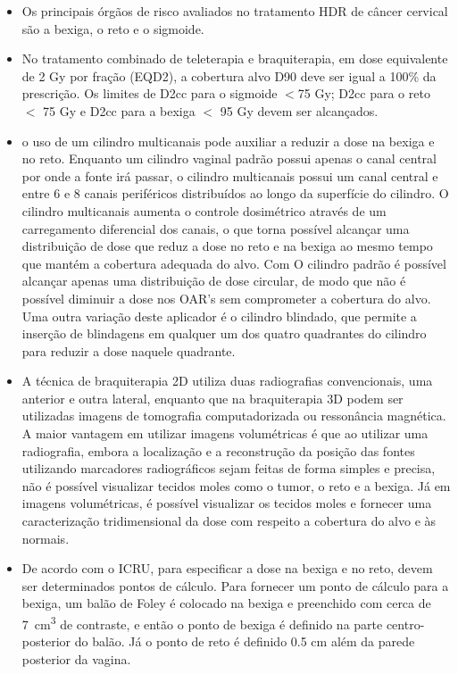 \documentclass[11pt,a4paper]{article}
\newcounter{exemplo}
\begin{document}
\begin{exemplo}[Braquiterapia]
\begin{itemize}
        \item Os principais órgãos de risco avaliados no tratamento HDR de câncer cervical são a bexiga, o reto e o sigmoide.
        
        \item No tratamento combinado de teleterapia e braquiterapia, em dose equivalente de 2 Gy por fração (EQD2), a cobertura alvo D90 deve ser igual a 100\% da prescrição. Os limites de D2cc para o sigmoide $<$75 Gy; D2cc para o reto $<$ 75 Gy e D2cc para a bexiga $<$ 95 Gy devem ser alcançados.
        
        \item o uso de um cilindro multicanais pode auxiliar a reduzir a dose na bexiga e no reto. Enquanto um cilindro vaginal padrão possui apenas o canal central por onde a fonte irá passar, o cilindro multicanais possui um canal central e entre 6 e 8 canais periféricos distribuídos ao longo da superfície do cilindro. O cilindro multicanais aumenta o controle dosimétrico através de um carregamento diferencial dos canais, o que torna possível alcançar uma distribuição de dose que reduz a dose no reto e na bexiga ao mesmo tempo que mantém a cobertura adequada do alvo. Com O cilindro padrão é possível alcançar apenas uma distribuição de dose circular, de modo que não é possível diminuir a dose nos OAR's sem comprometer a cobertura do alvo. Uma outra variação deste aplicador  é o cilindro blindado, que permite a inserção de blindagens em qualquer um dos quatro quadrantes do cilindro para reduzir a dose naquele quadrante.
        
        \item A técnica de braquiterapia 2D utiliza duas radiografias convencionais, uma anterior e outra lateral, enquanto que na braquiterapia 3D podem ser utilizadas imagens de tomografia computadorizada ou ressonância magnética. A maior vantagem em utilizar imagens volumétricas é que ao utilizar uma radiografia, embora a localização e a reconstrução da posição das fontes utilizando marcadores radiográficos sejam feitas de forma simples e precisa, não é possível visualizar tecidos moles como o tumor, o reto e a bexiga. Já em imagens volumétricas, é possível visualizar os tecidos moles e fornecer uma caracterização tridimensional da dose com respeito a cobertura do alvo e às normais.
        
        \item De acordo com o ICRU, para especificar a dose na bexiga e no reto, devem ser determinados pontos de cálculo. Para fornecer um ponto de cálculo para a bexiga, um balão de Foley é colocado na bexiga e preenchido com cerca de \qty{7}{cm^3} de contraste, e então o ponto de bexiga é definido na parte centro-posterior do balão. Já o ponto de reto é definido 0.5 cm além da parede posterior da vagina.
        

\end{itemize}
\end{exemplo}
\end{document}
